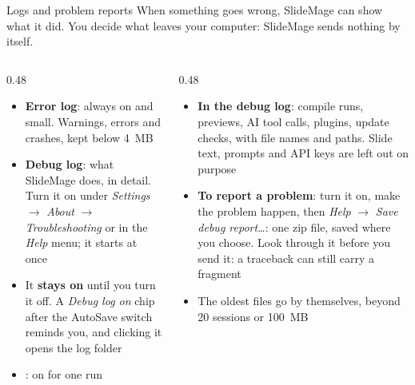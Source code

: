
\begin{standardframe}{Logs and problem reports}
	\small
	When something goes wrong, SlideMage can show what it did. You decide what leaves your computer: SlideMage sends \textcolor{c_primary_highlight}{nothing} by itself.
	\par
	\begin{columns}[T,onlytextwidth]
		\begin{column}{0.48\linewidth}
			\begin{itemize}
				\item \textbf{Error log}: always on and small. Warnings, errors and crashes, kept below 4~MB
				\item \textbf{Debug log}: what SlideMage does, in detail. Turn it on under \emph{Settings} $\rightarrow$ \emph{About} $\rightarrow$ \emph{Troubleshooting} or in the \emph{Help} menu; it starts at once
				\item It \textbf{stays on} until you turn it off. A \emph{Debug log on} chip after the AutoSave switch reminds you, and clicking it opens the log folder
				\item {}: on for one run
			\end{itemize}
		\end{column}
		\begin{column}{0.48\linewidth}
			\begin{itemize}
				\item \textbf{In the debug log}: compile runs, previews, AI tool calls, plugins, update checks, with file names and paths. Slide text, prompts and API keys are left out on purpose
				\item \textbf{To report a problem}: turn it on, make the problem happen, then \emph{Help} $\rightarrow$ \emph{Save debug report\ldots}: one zip file, saved where you choose. Look through it before you send it: a traceback can still carry a fragment
				\item The oldest files go by themselves, beyond 20 sessions or 100~MB
			\end{itemize}
		\end{column}
	\end{columns}
\end{standardframe}

